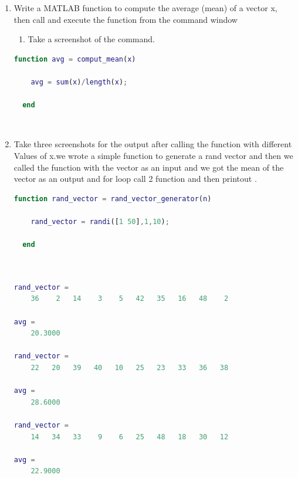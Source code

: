 \documentclass[12pt,a4paper]{article}
\begin{document}
\begin{enumerate}
  \item Write a MATLAB function to compute the average (mean) of a vector x, then call and execute the function from the command window
        \begin{enumerate}
          \item Take a screenshot of the command.
        \end{enumerate}

        \begin{lstlisting}[language=Matlab,style=mystyle]
  function avg = comput_mean(x)

    avg = sum(x)/length(x);

  end
\end{lstlisting}~\\[2cm]

  \item  Take three screenshots for the output after calling the function with different Values of x.we wrote a simple function to generate a rand vector and then we called the function with the vector as an input and we got the mean of the vector as an output and for loop call 2 function and then printout .


        \begin{lstlisting}[language=Matlab,style=mystyle]
  function rand_vector = rand_vector_generator(n)

    rand_vector = randi([1 50],1,10);

  end
  
\end{lstlisting}

        \begin{lstlisting}[language=Matlab, float=h, frame=tb, label=zebra, caption={output}]

rand_vector =
    36    2   14    3    5   42   35   16   48    2

avg =
    20.3000

rand_vector =
    22   20   39   40   10   25   23   33   36   38

avg =
    28.6000

rand_vector =
    14   34   33    9    6   25   48   18   30   12

avg =
    22.9000


\end{lstlisting}
\end{enumerate}
\end{document}
